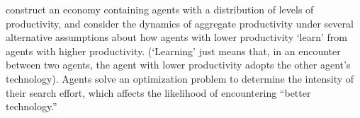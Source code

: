 \cite{lucas2014knowledge} construct an economy containing agents with a distribution of levels of productivity, and consider the dynamics of aggregate productivity under several alternative assumptions about how agents with lower productivity `learn' from agents with higher productivity.  (`Learning' just means that, in an encounter between two agents, the agent with lower productivity adopts the other agent's technology).  %
Agents solve an optimization problem to determine the intensity of their search effort, which affects the likelihood of encountering ``better technology.''  %


